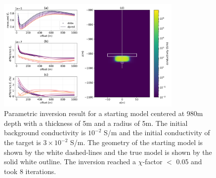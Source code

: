 \begin{figure}
    \begin{center}
    \includegraphics[width=0.8\textwidth]{figures/inversion/parametric_voxel1.png}
    \end{center}
\caption{
    Parametric inversion result for a starting model
    centered at 980m depth with a thickness of 5m and a radius of 5m. The initial background
    conductivity is $10^{-2}$ S/m and the initial conductivity of the target is $3\times10^{-2}$ S/m.
    The geometry of the starting model is shown by the white dashed-lines and the
    true model is shown by the solid white outline. The inversion reached a $\chi$-factor $<$ 0.05
    and took 8 iterations.
}
\label{fig:parametric_voxel1}
\end{figure}
